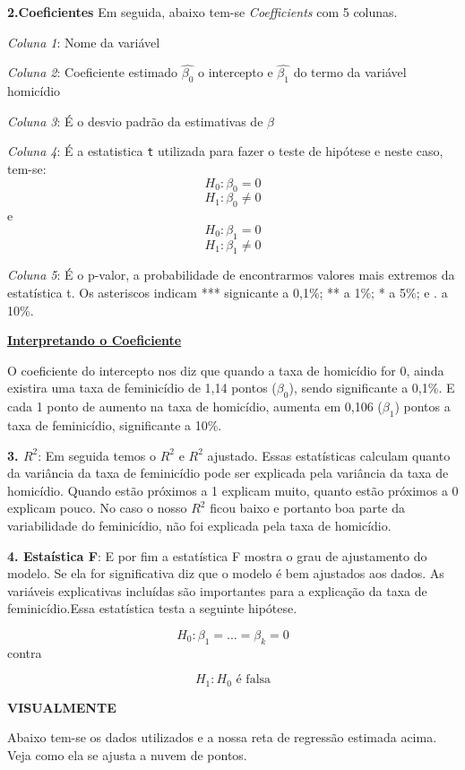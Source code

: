 \documentclass[
  letterpaper,
  DIV=11,
  numbers=noendperiod]{scrreprt}
\begin{document}
\textbf{2.Coeficientes} Em seguida, abaixo tem-se \emph{Coefficients}
com 5 colunas.

\emph{Coluna 1}: Nome da variável

\emph{Coluna 2}: Coeficiente estimado \(\hat{\beta_0}\) o intercepto e
\(\hat{\beta_1}\) do termo da variável homicídio

\emph{Coluna 3}: É o desvio padrão da estimativas de \(\beta\)

\emph{Coluna 4}: É a estatistica \texttt{t} utilizada para fazer o teste
de hipótese e neste caso, tem-se: \[H_0:\beta_0=0\]
\[H_1:\beta_0 \neq 0\] e \[H_0:\beta_1=0\] \[H_1:\beta_1 \neq 0\]

\emph{Coluna 5}: É o p-valor, a probabilidade de encontrarmos valores
mais extremos da estatística t. Os asteriscos indicam *** signicante a
0,1\%; ** a 1\%; * a 5\%; e \(.\) a 10\%.

\textbf{\ul{Interpretando o Coeficiente}}

O coeficiente do intercepto nos diz que quando a taxa de homicídio for
0, ainda existira uma taxa de feminicídio de 1,14 pontos (\(\beta_0\)),
sendo significante a 0,1\%. E cada 1 ponto de aumento na taxa de
homicídio, aumenta em 0,106 (\(\beta_1\)) pontos a taxa de feminicídio,
significante a 10\%.

\textbf{3. \(R^2\)}: Em seguida temos o \(R^2\) e \(R^2\) ajustado.
Essas estatísticas calculam quanto da variância da taxa de feminicídio
pode ser explicada pela variância da taxa de homicídio. Quando estão
próximos a 1 explicam muito, quanto estão próximos a 0 explicam pouco.
No caso o nosso \(R^2\) ficou baixo e portanto boa parte da
variabilidade do feminicídio, não foi explicada pela taxa de homicídio.

\textbf{4. Estaística F}: E por fim a estatística F mostra o grau de
ajustamento do modelo. Se ela for significativa diz que o modelo é bem
ajustados aos dados. As variáveis explicativas incluídas são importantes
para a explicação da taxa de feminicídio.Essa estatística testa a
seguinte hipótese.

\[H_0:\beta_1=...=\beta_k=0\] contra

\[H_1: H_0\text{ é falsa}\]

\textbf{VISUALMENTE}

Abaixo tem-se os dados utilizados e a nossa reta de regressão estimada
acima. Veja como ela se ajusta a nuvem de pontos.
\end{document}
